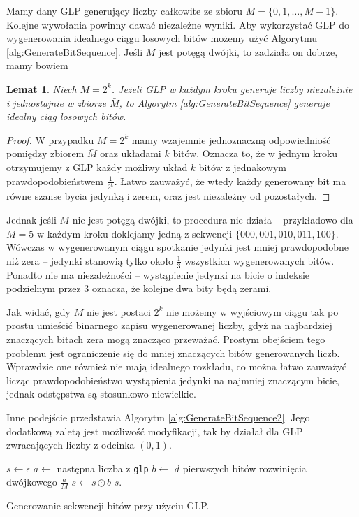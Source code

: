 \documentclass[a4paper,11pt,twoside]{book}
\newtheorem{lemat}[twier]{Lemat}
\theoremstyle{definition}
\begin{document}
Mamy dany GLP generujący liczby całkowite ze zbioru $\bar{M} = \{0, 1, \ldots, M-1 \}$. Kolejne wywołania powinny dawać niezależne wyniki. Aby wykorzystać GLP do wygenerowania idealnego ciągu losowych bitów możemy użyć Algorytmu \ref{alg:GenerateBitSequence}. Jeśli $M$ jest potęgą dwójki, to zadziała on dobrze, mamy bowiem
\begin{lemat}
 Niech $M = 2^k$. Jeżeli GLP w każdym kroku generuje liczby niezależnie i jednostajnie w zbiorze $\bar{M}$, to Algorytm \ref{alg:GenerateBitSequence} generuje idealny ciąg losowych bitów.
\end{lemat}
\begin{proof}
 W przypadku $M = 2^k$ mamy wzajemnie jednoznaczną odpowiedniość pomiędzy zbiorem $\bar{M}$ oraz układami $k$ bitów. Oznacza to, że w jednym kroku otrzymujemy z GLP każdy możliwy układ $k$ bitów z jednakowym prawdopodobieństwem $\frac{1}{2^k}$. Łatwo zauważyć, że wtedy każdy generowany bit ma równe szanse bycia jedynką i zerem, oraz jest niezależny od pozostałych.
\end{proof}

Jednak jeśli $M$ nie jest potęgą dwójki, to procedura nie działa -- przykładowo dla $M=5$ w każdym kroku doklejamy jedną z sekwencji $\{000, 001, 010, 011, 100\}$. Wówczas w wygenerowanym ciągu spotkanie jedynki jest mniej prawdopodobne niż zera -- jedynki stanowią tylko około $\frac{1}{3}$ wszystkich wygenerowanych bitów. Ponadto nie ma niezależności -- wystąpienie jedynki na bicie o indeksie podzielnym przez 3 oznacza, że kolejne dwa bity będą zerami.

Jak widać, gdy $M$ nie jest postaci $2^k$ nie możemy w wyjściowym ciągu tak po prostu umieścić binarnego zapisu wygenerowanej liczby, gdyż na najbardziej znaczących bitach zera mogą znacząco przeważać. Prostym obejściem tego problemu jest ograniczenie się do mniej znaczących bitów generowanych liczb. Wprawdzie one również nie mają idealnego rozkładu, co można łatwo zauważyć licząc prawdopodobieństwo wystąpienia jedynki na najmniej znaczącym bicie, jednak odstępstwa są stosunkowo niewielkie.

Inne podejście przedstawia Algorytm \ref{alg:GenerateBitSequence2}. Jego dodatkową zaletą jest możliwość modyfikacji, tak by działał dla GLP zwracających liczby z odcinka $(0,1)$.
\begin{algorithm}
 \begin{algorithmic}[1]
    \State $s \gets \epsilon$
      \State $a \gets$ następna liczba z \texttt{glp}
      \State $b \gets$ $d$ pierwszych bitów rozwinięcia dwójkowego $\frac{a}{M}$
      \State $s \gets s \odot b$
     \EndWhile
    \State \Return $s$.
  \EndFunction
 \end{algorithmic}
 \caption{Generowanie sekwencji bitów przy użyciu GLP.}
 \label{alg:GenerateBitSequence2}
\end{algorithm}
\end{document}
